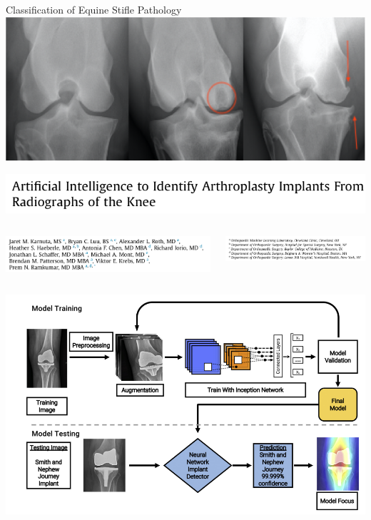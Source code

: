 \begin{frame}{Classification of Equine Stifle Pathology}
   \centering
   \includegraphics[width=0.85\linewidth]{images/stifle-pathologies.png}
\end{frame}

\begin{frame}
   \centering
   \includegraphics[width=0.7\linewidth]{images/tka-classification-title.png}
   \begin{columns}
      \begin{column}{0.6\linewidth}
         \includegraphics[width=\columnwidth]{images/tka-classification-authors.png}
      \end{column}
      \begin{column}{0.5\linewidth}
         \includegraphics[width=\columnwidth]{images/tka-classification-universities.png}
      \end{column}
   \end{columns}
   \vfill
   \includegraphics[width=0.65\linewidth]{images/tka-classification.png}
\end{frame}

